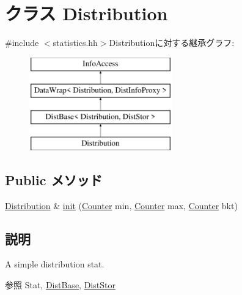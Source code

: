 \hypertarget{classStats_1_1Distribution}{
\section{クラス Distribution}
\label{classStats_1_1Distribution}
}


{\ttfamily \#include $<$statistics.hh$>$}Distributionに対する継承グラフ:\begin{figure}[H]
\begin{center}
\leavevmode
\includegraphics[height=4cm]{classStats_1_1Distribution}
\end{center}
\end{figure}
\subsection*{Public メソッド}
\begin{DoxyCompactItemize}
\item 
\hyperlink{classStats_1_1Distribution}{Distribution} \& \hyperlink{classStats_1_1Distribution_a330a131f9f1614fae623ba309b61a590}{init} (\hyperlink{namespaceStats_ac35128c026c72bb36af9cea00774e8a6}{Counter} min, \hyperlink{namespaceStats_ac35128c026c72bb36af9cea00774e8a6}{Counter} max, \hyperlink{namespaceStats_ac35128c026c72bb36af9cea00774e8a6}{Counter} bkt)
\end{DoxyCompactItemize}


\subsection{説明}
A simple distribution stat. \begin{DoxySeeAlso}{参照}
Stat, \hyperlink{classStats_1_1DistBase}{DistBase}, \hyperlink{classStats_1_1DistStor}{DistStor} 
\end{DoxySeeAlso}



